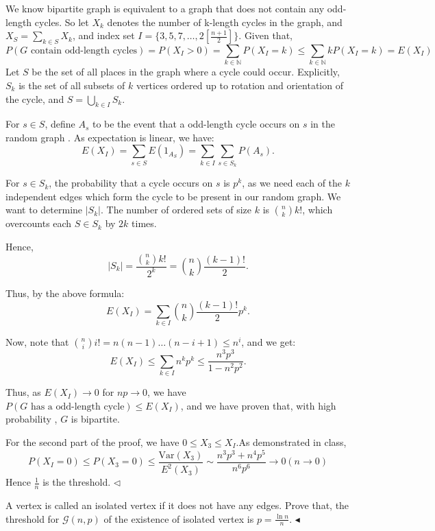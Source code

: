 \documentclass[11pt]{article}
\newenvironment{problem}[2][Problem]{\begin{trivlist}
\item[\hskip \labelsep {\bfseries #1}\hskip \labelsep {\bfseries #2.}]}{\hfill$\blacktriangleleft$\end{trivlist}}
\newenvironment{answer}[1][Answer]{\begin{trivlist}
\item[\hskip \labelsep {\bfseries #1.}\hskip \labelsep]}{\hfill$\lhd$\end{trivlist}}
\begin{document}
\begin{answer}
    We know bipartite graph is equivalent to a graph that does not contain any odd-length cycles. So let $X_k$ denotes the number of k-length cycles in the graph, and $X_S=\sum_{k\in S}X_k$, and index set $I=\{3,5,7,\dots,2[\frac{n+1}{2}]\}$. Given that,
$$P(G \text{ contain odd-length cycles})=P(X_I>0)=\sum_{k\in \mathbb N}P(X_I=k)\leq\sum_{k\in \mathbb N}kP(X_I=k)=E(X_I)$$
    Let \( S \) be the set of all places in the graph where a cycle could occur. Explicitly, \( S_k \) is the set of all subsets of \( k \) vertices ordered up to rotation and orientation of the cycle, and \( S = \bigcup_{k \in I} S_k \).

For \( s \in S \), define \( A_s \) to be the event that a odd-length cycle occurs on \( s \) in the random graph . As expectation is linear, we have:
\[
E(X_I) = \sum_{s\in S} E(1_{A_S}) = \sum_{k \in I} \sum_{s \in S_k} P(A_s).
\]

For \( s \in S_k \), the probability that a cycle occurs on \( s \) is \( p^k \), as we need each of the \( k \) independent edges which form the cycle to be present in our random graph. We want to determine \( |S_k| \). The number of ordered sets of size \( k \) is \( \binom{n}{k} k! \), which overcounts each \( S \in S_k \) by \( 2k \) times. 

Hence, 
\[
|S_k| = \frac{\binom{n}{k} k!}{2^k} = \binom{n}{k} \frac{(k-1)!}{2}.
\]

Thus, by the above formula:
\[
E(X_I) = \sum_{k \in I} \binom{n}{k} \frac{(k-1)!}{2} p^k.
\]

Now, note that \( \binom{n}{i} i! = n(n-1)\dots(n-i+1) \leq n^i \), and we get:
\[
E(X_I) \leq \sum_{k \in I} n^kp^k \leq \frac{n^3 p^3}{1 - n^2p^2}.
\]

Thus, as \( E(X_I) \to 0 \) for \( np \to 0 \), we have \( P(G \text{ has a odd-length cycle}) \leq E(X_I) \), and we have proven that, with high probability , \( G \) is bipartite.

For the second part of the proof, we have $0\leq X_3\leq X_I$.As demonstrated in class, $$P(X_I=0)\leq P(X_3=0)\leq \frac{\text{Var}(X_3)}{E^2(X_3)}\sim\frac{n^3p^3+n^4p^5}{n^6p^6}\to0(n\to 0)$$ 
Hence $\frac{1}{n}$ is the threshold.
\end{answer}

\begin{problem}{3 (18')}
A vertex is called an isolated vertex if it does not have any edges. Prove that, the threshold for $\mathcal{G}(n,p)$ of the existence of isolated vertex is $p=\frac{\ln n}{n}$.
\end{problem}
\end{document}
